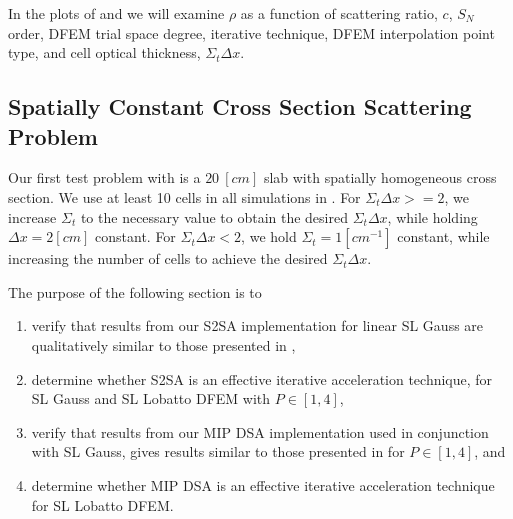 In the plots of  and  we will examine $\rho$ as a function of scattering ratio, $c$, $S_N$ order, DFEM trial space degree, iterative technique, DFEM interpolation point type, and cell optical thickness, $\Sigma_t \Delta x$.

\subsection{Spatially Constant Cross Section Scattering Problem}
\label{sec:chap4_constant_xs}

Our first test problem with is a $20~[cm]$ slab with spatially homogeneous cross section.  
We use at least 10 cells in all simulations in .
For $\Sigma_t \Delta x >= 2$, we increase $\Sigma_t$ to the necessary value to obtain the desired $\Sigma_t \Delta x$, while holding $\Delta x = 2[cm]$ constant.
For $\Sigma_t \Delta x < 2$, we hold $\Sigma_t = 1[cm^{-1}]$ constant, while increasing the number of cells to achieve the desired $\Sigma_t \Delta x$.

The purpose of the following section is to 
\begin{enumerate}
\item verify that results from our S2SA implementation for linear SL Gauss are qualitatively similar to those presented in \cite{s2sa},
\item determine whether S2SA is an effective iterative acceleration technique, for SL Gauss and SL Lobatto DFEM with $P \in[1,4]$,
\item verify that results from our MIP DSA implementation used in conjunction with SL Gauss, gives results similar to those presented in \cite{mip_dsa} for $P\in[1,4]$, and 
\item  determine whether MIP DSA is an effective iterative acceleration technique for SL Lobatto DFEM.
\end{enumerate}

